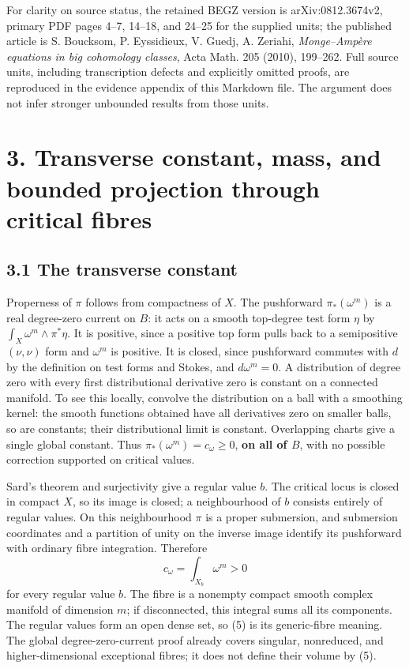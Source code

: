 \documentclass[
  11pt,
]{article}
\begin{document}
For clarity on source status, the retained BEGZ version is arXiv:0812.3674v2, primary PDF pages 4--7, 14--18, and 24--25 for the supplied units; the published article is S. Boucksom, P. Eyssidieux, V. Guedj, A. Zeriahi, \emph{Monge--Ampère equations in big cohomology classes}, Acta Math. 205 (2010), 199--262. Full source units, including transcription defects and explicitly omitted proofs, are reproduced in the evidence appendix of this Markdown file. The argument does not infer stronger unbounded results from those units.

\section{3. Transverse constant, mass, and bounded projection through critical fibres}\label{transverse-constant-mass-and-bounded-projection-through-critical-fibres}

\subsection{3.1 The transverse constant}\label{the-transverse-constant}

Properness of \(\pi\) follows from compactness of \(X\). The pushforward \(\pi_*(\omega^m)\) is a real degree-zero current on \(B\): it acts on a smooth top-degree test form \(\eta\) by \(\int_X\omega^m\wedge\pi^*\eta\). It is positive, since a positive top form pulls back to a semipositive \((\nu,\nu)\) form and \(\omega^m\) is positive. It is closed, since pushforward commutes with \(d\) by the definition on test forms and Stokes, and \(d\omega^m=0\). A distribution of degree zero with every first distributional derivative zero is constant on a connected manifold. To see this locally, convolve the distribution on a ball with a smoothing kernel: the smooth functions obtained have all derivatives zero on smaller balls, so are constants; their distributional limit is constant. Overlapping charts give a single global constant. Thus \(\pi_*(\omega^m)=c_\omega\geq0\), \textbf{on all of \(B\)}, with no possible correction supported on critical values.

Sard's theorem and surjectivity give a regular value \(b\). The critical locus is closed in compact \(X\), so its image is closed; a neighbourhood of \(b\) consists entirely of regular values. On this neighbourhood \(\pi\) is a proper submersion, and submersion coordinates and a partition of unity on the inverse image identify its pushforward with ordinary fibre integration. Therefore \[
c_\omega=\int_{X_b}\omega^m>0                                  \tag{5}
\] for every regular value \(b\). The fibre is a nonempty compact smooth complex manifold of dimension \(m\); if disconnected, this integral sums all its components. The regular values form an open dense set, so (5) is its generic-fibre meaning. The global degree-zero-current proof already covers singular, nonreduced, and higher-dimensional exceptional fibres; it does not define their volume by (5).
\end{document}

